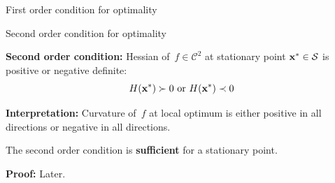 \documentclass[11pt,compress,t,notes=noshow, xcolor=table]{beamer}
\begin{document}
\begin{vbframe}{First order condition for optimality}
\end{vbframe}

\begin{vbframe}{Second order condition for optimality}

\vspace{-0.5\baselineskip}

\begin{kframe}
    \textbf{Second order condition:}
    Hessian of~$f \in \mathcal{C}^2$ at stationary point $\mathbf{x}^\ast \in \mathcal{S}$ is positive or negative definite:
    \vspace{-0.5\baselineskip}
    \begin{equation*}
        H(\mathbf{x}^\ast) \succ 0 \text{ or } H(\mathbf{x}^\ast) \prec 0
    \end{equation*}
\end{kframe}

\textbf{Interpretation:} Curvature of~$f$ at local optimum is either positive in all directions or negative in all directions.

\vspace{0.5\baselineskip}

The second order condition is \textbf{sufficient} for a stationary point.

\begin{footnotesize}
    \textbf{Proof:} Later.
\end{footnotesize}






\end{vbframe}
\end{document}
